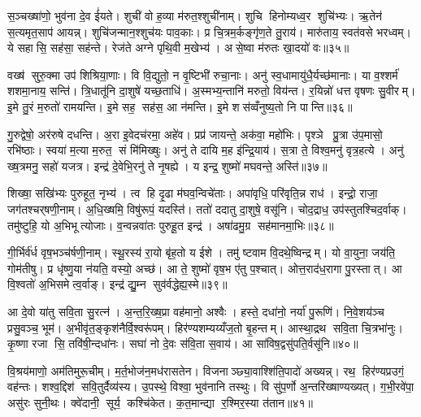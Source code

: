 स॒ञ्चख्षा॑णो॒ भुव॑ना दे॒व ई॑यते। शुची॑ वो ह॒व्या म॑रुत॒श्शुची॑नाम्। शुचि हिनोम्यध्व॒र शुचि॑भ्यः। ऋ॒तेन॑ स॒त्यमृत॒साप॑ आयन्न्। शुचि॑जन्मान॒श्शुच॑यः पाव॒काः। प्र चि॒त्रम॒र्कङ्गृ॑ण॒ते तु॒राय॑। मारु॑ताय॒ स्वत॑वसे भरध्वम्। ये सहासि॒ सह॑सा॒ सह॑न्ते। रेज॑ते अग्ने पृथि॒वी म॒खेभ्य॑। असे॒ष्वा म॑रुतः खा॒दयो॑ वः॥३५॥

वख्ष॑ सुरु॒क्मा उप॑ शिश्रिया॒णाः। वि वि॒द्युतो॒ न वृ॒ष्टिभी॑ रुचा॒नाः। अनु॑ स्व॒धामायु॑धै॒र्यच्छ॑मानाः। या व॒श्शर्म॑ शशमा॒नाय॒ सन्ति॑। त्रि॒धातू॑नि दा॒शुषे॑ यच्छ॒ताधि॑। अ॒स्मभ्य॒न्तानि॑ मरुतो॒ विय॑न्त। र॒यिन्नो॑ धत्त वृषणः सु॒वीरम्। इ॒मे तु॒रं म॒रुतो॑ रामयन्ति। इ॒मे सह॒ सह॑स॒ आ न॑मन्ति। इ॒मे शस॑व्वँनुष्य॒तो नि पान्ति॥३६॥

गु॒रुद्वेषो॒ अर॑रुषे दधन्ति। अ॒रा इ॒वेदच॑रमा॒ अहे॑व। प्रप्र॑ जायन्ते॒ अक॑वा॒ महो॑भिः। पृश्ञे प्रु॒त्रा उ॑प॒मासो॒ रभि॑ष्ठाः। स्वया॑ म॒त्या म॒रुत॒ सं मि॑मिख्षुः। अनु॑ ते दायि म॒ह इ॑न्द्रि॒याय॑। स॒त्रा ते॒ विश्व॒मनु॑ वृत्र॒हत्ये। अनु॑ ख्ष॒त्रमनु॒ सहो॑ यजत्र। इन्द्र॑ दे॒वेभि॒रनु॑ ते नृ॒षह्ये। य इन्द्र॒ शुष्मो॑ मघवन्ते॒ अस्ति॑॥३७॥

शिख्षा॒ सखि॑भ्यः पुरुहूत॒ नृभ्य॑। त्व हि दृ॒ढा म॑घव॒न्विचे॑ताः। अपा॑वृधि॒ परि॑वृति॒न्न राध॑। इन्द्रो॒ राजा॒ जग॑तश्चर्‌षणी॒नाम्। अ॒धि॒ख्षमि॒ विषु॑रूपं॒ यदस्ति॑। ततो॑ ददातु दा॒शुषे॒ वसू॑नि। चोद॒द्राध॒ उप॑स्तुतश्चिद॒र्वाक्। तमु॑ष्टुहि॒ यो अ॒भिभूत्योजाः। व॒न्वन्नवा॑तः पुरुहू॒त इन्द्र॑। अषा॑ढमु॒ग्र सह॑मानमा॒भिः॥३८॥

गी॒र्भिर्व॑र्ध वृष॒भञ्च॑र्\mbox{}षणी॒नाम्। स्थू॒रस्य॑ रा॒यो बृ॑ह॒तो य ईशे। तमु॑ ष्टवाम वि॒दथे॒ष्विन्द्रम्। यो वा॒युना॒ जय॑ति॒ गोम॑तीषु। प्र धृ॑ष्णु॒या न॑यति॒ वस्यो॒ अच्छ॑। आ ते॒ शुष्मो॑ वृष॒भ ए॑तु प॒श्चात्। ओत्त॒राद॑ध॒रागा पु॒रस्तात्। आ वि॒श्वतो॑ अ॒भिसमेत्व॒र्वाङ्। इन्द्र॑ द्यु॒म्न सुव॑र्वद्धेह्य॒स्मे॥३९॥\anuvakamend[व॒राहैर्वि॒श्वहा॑ऽजनिष्ट पू॒षोद्वरी॑वृजत्खा॒दयो॑ वः पा॒न्त्यस्त्या॒भिर्नव॑ च]

आ दे॒वो या॑तु सवि॒ता सु॒रत्न॑। अ॒न्त॒रि॒ख्ष॒प्रा वह॑मानो॒ अश्वैः। हस्ते॒ दधा॑नो॒ नर्या॑ पु॒रूणि॑। नि॒वे॒शय॑ञ्च प्रसु॒वञ्च॒ भूम॑। अ॒भीवृ॑त॒ङ्कृश॑नैर्वि॒श्वरू॑पम्। हिर॑ण्यशम्यय्यँज॒तो बृ॒हन्तम्। आस्था॒द्रथ सवि॒ता चि॒त्रभा॑नुः। कृ॒ष्णा रजा सि॒ तवि॑षी॒न्दधा॑नः। सघा॑ नो दे॒वः स॑वि॒ता स॒वाय॑। आ सा॑विष॒द्वसु॑पति॒र्वसू॑नि॥४०॥

वि॒श्रय॑माणो॒ अम॑तिमुरू॒चीम्। म॒र्त॒भोज॑न॒मध॑रासतेन। विजनाञ्छ्या॒वाश्शि॑ति॒पादो॑ अख्यन्न्। रथ॒ हिर॑ण्यप्रउगं॒ वह॑न्तः। शश्व॒द्दिश॑ सवि॒तुर्दैव्य॑स्य। उ॒पस्थे॒ विश्वा॒ भुव॑नानि तस्थुः। वि सु॑प॒र्णो अ॒न्तरि॑ख्षाण्यख्यत्। ग॒भी॒रवे॑पा॒ असु॑रः सुनी॒थः। क्वे॑दानी॒ सूर्य॒ कश्चि॑केत। क॒त॒मान्द्या र॒श्मिर॒स्या त॑तान॥४१॥


